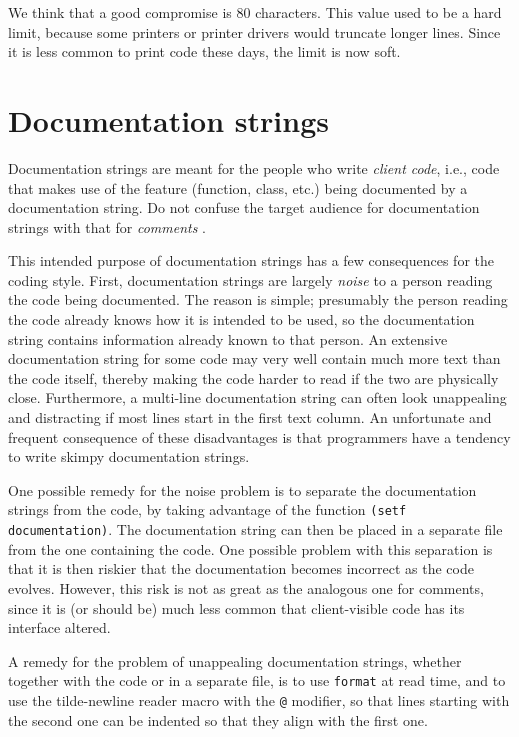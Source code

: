 We think that a good compromise is 80 characters.  This value used to
be a hard limit, because some printers or printer drivers would
truncate longer lines.  Since it is less common to print code these
days, the limit is now soft.

\section{Documentation strings}
\label{sec-general-coding-style-documentation-strings}

Documentation strings are meant for the people who write \emph{client
  code}, i.e., code that makes use of the feature (function, class,
etc.) being documented by a documentation string.  Do not confuse the
target audience for documentation strings with that for
\emph{comments} .

This intended purpose of documentation strings has a few consequences
for the coding style.  First, documentation strings are largely
\emph{noise} to a person reading the code being documented.  The
reason is simple; presumably the person reading the code already knows
how it is intended to be used, so the documentation string contains
information already known to that person.  An extensive documentation
string for some code may very well contain much more text than the
code itself, thereby making the code harder to read if the two are
physically close.  Furthermore, a multi-line documentation string can
often look unappealing and distracting if most lines start in the
first text column.  An unfortunate and frequent consequence of these
disadvantages is that programmers have a tendency to write skimpy
documentation strings.

One possible remedy for the noise problem is to separate the
documentation strings from the code, by taking advantage of the
function \texttt{(setf documentation)}.  The documentation string can
then be placed in a separate file from the one containing the code.
One possible problem with this separation is that it is then riskier
that the documentation becomes incorrect as the code evolves.
However, this risk is not as great as the analogous one for comments,
since it is (or should be) much less common that client-visible code
has its interface altered.

A remedy for the problem of unappealing documentation strings, whether
together with the code or in a separate file, is to use
\texttt{format} at read time, and to use the tilde-newline reader
macro with the \texttt{@} modifier, so that lines starting with the
second one can be indented so that they align with the first one.

